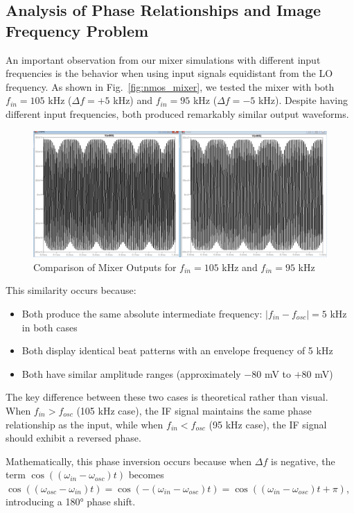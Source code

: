 \subsection{Analysis of Phase Relationships and Image Frequency Problem}

An important observation from our mixer simulations with different input frequencies is the behavior when using input signals equidistant from the LO frequency. As shown in Fig.~\ref{fig:nmos_mixer}, we tested the mixer with both $f_{in} = 105$ kHz ($\Delta f = +5$ kHz) and $f_{in} = 95$ kHz ($\Delta f = -5$ kHz). Despite having different input frequencies, both produced remarkably similar output waveforms.

\begin{figure}[H]
    \centering
    \includegraphics[width=1\linewidth]{fig/compare.png}
    \caption{Comparison of Mixer Outputs for $f_{in} = 105$ kHz and $f_{in} = 95$ kHz}
    \label{fig:image_frequency}
\end{figure}

This similarity occurs because:

\begin{itemize}
    \item Both produce the same absolute intermediate frequency: $|f_{in} - f_{osc}| = 5$ kHz in both cases
    \item Both display identical beat patterns with an envelope frequency of 5 kHz
    \item Both have similar amplitude ranges (approximately $-80$ mV to $+80$ mV)
\end{itemize}

The key difference between these two cases is theoretical rather than visual. When $f_{in} > f_{osc}$ (105 kHz case), the IF signal maintains the same phase relationship as the input, while when $f_{in} < f_{osc}$ (95 kHz case), the IF signal should exhibit a reversed phase.

Mathematically, this phase inversion occurs because when $\Delta f$ is negative, the term $\cos((\omega_{in} - \omega_{osc})t)$ becomes $\cos((\omega_{osc} - \omega_{in})t) = \cos(-(\omega_{in} - \omega_{osc})t) = \cos((\omega_{in} - \omega_{osc})t + \pi)$, introducing a 180° phase shift.

